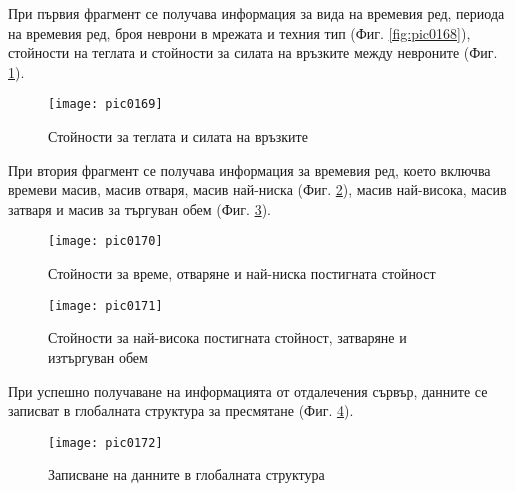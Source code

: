 При първия фрагмент се получава информация за вида на времевия ред, периода на времевия ред, броя неврони в мрежата и техния тип (Фиг. \ref{fig:pic0168}), стойности на теглата и стойности за силата на връзките между невроните (Фиг. \ref{fig:pic0169}).

\begin{figure}[h]
  \centering
  \texttt{[image: pic0169]}
  \caption{Стойности за теглата и силата на връзките}
\label{fig:pic0169}
\end{figure}
\FloatBarrier

При втория фрагмент се получава информация за времевия ред, което включва времеви масив, масив отваря, масив най-ниска (Фиг. \ref{fig:pic0170}), масив най-висока, масив затваря и масив за търгуван обем (Фиг. \ref{fig:pic0171}).

\begin{figure}[h]
  \centering
  \texttt{[image: pic0170]}
  \caption{Стойности за време, отваряне и най-ниска постигната стойност}
\label{fig:pic0170}
\end{figure}
\FloatBarrier

\begin{figure}[h]
  \centering
  \texttt{[image: pic0171]}
  \caption{Стойности за най-висока постигната стойност, затваряне и изтъргуван обем}
\label{fig:pic0171}
\end{figure}
\FloatBarrier

При успешно получаване на информацията от отдалечения сървър, данните се записват в глобалната структура за пресмятане (Фиг. \ref{fig:pic0172}).

\begin{figure}[h]
  \centering
  \texttt{[image: pic0172]}
  \caption{Записване на данните в глобалната структура}
\label{fig:pic0172}
\end{figure}
\FloatBarrier
